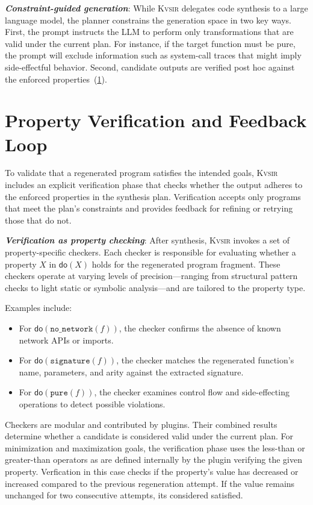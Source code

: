 \documentclass[noacm,sigplan,review]{acmart}
\newcommand{\sys}{{\scshape Kv{\textalpha}sir}\xspace}
\newcommand{\heading}[1]{\vspace{2pt}\noindent\textbf{\emph{#1}}:\enspace}
\begin{document}
\heading{Constraint-guided generation}
While \sys delegates code synthesis to a large language model, the planner constrains the generation space in two key ways.
First, the prompt instructs the LLM to perform only transformations that are valid under the current plan.
For instance, if the target function must be pure, the prompt will exclude information such as system-call traces that might imply side-effectful behavior.
Second, candidate outputs are verified post hoc against the enforced properties~(\cref{sec:verification}).

\section{Property Verification and Feedback Loop}
\label{sec:verification}

To validate that a regenerated program satisfies the intended goals, \sys includes an explicit verification phase that checks whether the output adheres to the enforced properties in the synthesis plan. 
Verification accepts only programs that meet the plan's constraints and provides feedback for refining or retrying those that do not.

\heading{Verification as property checking}
After synthesis, \sys invokes a set of property-specific checkers. Each checker is responsible for evaluating whether a property $X$ in $\mathsf{do}(X)$ holds for the regenerated program fragment. These checkers operate at varying levels of precision---ranging from structural pattern checks to light static or symbolic analysis---and are tailored to the property type.

Examples include:
\begin{itemize}
  \item For $\mathsf{do}(\texttt{no\_network}(f))$, the checker confirms the absence of known network APIs or imports.
  \item For $\mathsf{do}(\texttt{signature}(f))$, the checker matches the regenerated function's name, parameters, and arity against the extracted signature.
  \item For $\mathsf{do}(\texttt{pure}(f))$, the checker examines control flow and side-effecting operations to detect possible violations.
\end{itemize}

Checkers are modular and contributed by plugins. Their combined results determine whether a candidate is considered valid under the current plan.
For minimization and maximization goals, the verification phase uses the less-than or greater-than operators as are defined internally by the plugin verifying the given property.
Verfication in this case checks if the property's value has decreased or increased compared 
to the previous regeneration attempt.
If the value remains unchanged for two consecutive attempts, its considered satisfied.
\end{document}
